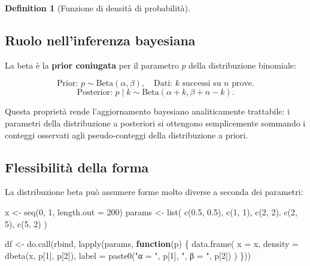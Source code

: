 \documentclass[
  letterpaper,
  DIV=11,
  numbers=noendperiod,
  oneside]{scrreprt}
\newenvironment{Shaded}{\begin{snugshade}}{\end{snugshade}}
\newcommand{\AttributeTok}[1]{\textcolor[rgb]{0.40,0.45,0.13}{#1}}
\newcommand{\ControlFlowTok}[1]{\textcolor[rgb]{0.00,0.23,0.31}{\textbf{#1}}}
\newcommand{\DecValTok}[1]{\textcolor[rgb]{0.68,0.00,0.00}{#1}}
\newcommand{\FloatTok}[1]{\textcolor[rgb]{0.68,0.00,0.00}{#1}}
\newcommand{\FunctionTok}[1]{\textcolor[rgb]{0.28,0.35,0.67}{#1}}
\newcommand{\NormalTok}[1]{\textcolor[rgb]{0.00,0.23,0.31}{#1}}
\newcommand{\OtherTok}[1]{\textcolor[rgb]{0.00,0.23,0.31}{#1}}
\newcommand{\StringTok}[1]{\textcolor[rgb]{0.13,0.47,0.30}{#1}}
\theoremstyle{definition}
\theoremstyle{plain}
\theoremstyle{definition}
\newtheorem{definition}{Definition}[chapter]
\theoremstyle{remark}
\begin{document}
\begin{definition}[Funzione di densità di
probabilità]
\subsection{Ruolo nell'inferenza
bayesiana}\label{ruolo-nellinferenza-bayesiana-10}

La beta è la \textbf{prior coniugata} per il parametro \(p\) della
distribuzione binomiale:

\[
\text{Prior: } p \sim \text{Beta}(\alpha, \beta), \quad \text{Dati: } k \text{ successi su } n \text{ prove}.
\] \[
\text{Posterior: } p \mid k \sim \text{Beta}(\alpha + k, \beta + n - k).
\]

Questa proprietà rende l'aggiornamento bayesiano analiticamente
trattabile: i parametri della distribuzione a posteriori si ottengono
semplicemente sommando i conteggi osservati agli pseudo-conteggi della
distribuzione a priori.

\subsection{Flessibilità della forma}\label{flessibilituxe0-della-forma}

La distribuzione beta può assumere forme molto diverse a seconda dei
parametri:

\begin{Shaded}
\begin{Highlighting}[]
\NormalTok{x }\OtherTok{\textless{}{-}} \FunctionTok{seq}\NormalTok{(}\DecValTok{0}\NormalTok{, }\DecValTok{1}\NormalTok{, }\AttributeTok{length.out =} \DecValTok{200}\NormalTok{)}
\NormalTok{params }\OtherTok{\textless{}{-}} \FunctionTok{list}\NormalTok{(}
  \FunctionTok{c}\NormalTok{(}\FloatTok{0.5}\NormalTok{, }\FloatTok{0.5}\NormalTok{), }\FunctionTok{c}\NormalTok{(}\DecValTok{1}\NormalTok{, }\DecValTok{1}\NormalTok{), }\FunctionTok{c}\NormalTok{(}\DecValTok{2}\NormalTok{, }\DecValTok{2}\NormalTok{), }\FunctionTok{c}\NormalTok{(}\DecValTok{2}\NormalTok{, }\DecValTok{5}\NormalTok{), }\FunctionTok{c}\NormalTok{(}\DecValTok{5}\NormalTok{, }\DecValTok{2}\NormalTok{)}
\NormalTok{)}

\NormalTok{df }\OtherTok{\textless{}{-}} \FunctionTok{do.call}\NormalTok{(rbind, }\FunctionTok{lapply}\NormalTok{(params, }\ControlFlowTok{function}\NormalTok{(p) \{}
  \FunctionTok{data.frame}\NormalTok{(}
    \AttributeTok{x =}\NormalTok{ x,}
    \AttributeTok{density =} \FunctionTok{dbeta}\NormalTok{(x, p[}\DecValTok{1}\NormalTok{], p[}\DecValTok{2}\NormalTok{]),}
    \AttributeTok{label =} \FunctionTok{paste0}\NormalTok{(}\StringTok{"α = "}\NormalTok{, p[}\DecValTok{1}\NormalTok{], }\StringTok{", β = "}\NormalTok{, p[}\DecValTok{2}\NormalTok{])}
\NormalTok{  )}
\NormalTok{\}))}


\end{Highlighting}
\end{Shaded}
\end{definition}
\end{document}
